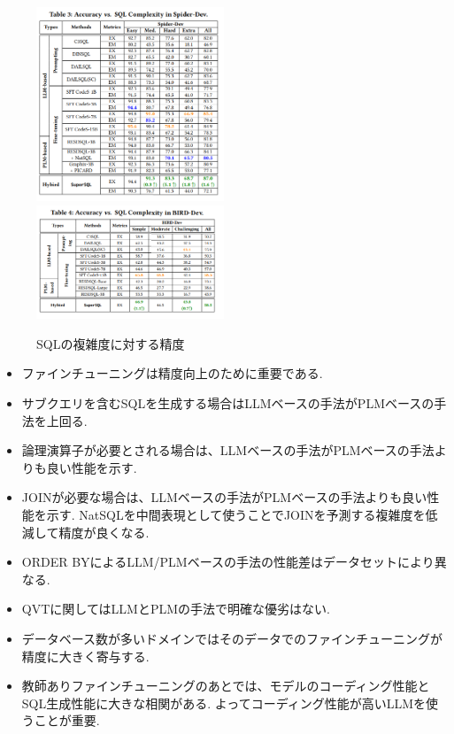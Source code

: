\documentclass[dvipdfmx,uplatex]{jsarticle}
\theoremstyle{remark}
\newenvironment{experiment}[1]{
    \begin{tcolorbox}[
        colframe=violet,
        colback=violet!10!white,
        colbacktitle=violet!40!white,
        coltitle=black,
        fonttitle=\bfseries,
        title={#1}
    ]
}{
    \end{tcolorbox}
}
\begin{document}
\begin{figure}
    \centering
    \includegraphics[width=0.5\textwidth]{img/dawn-nl2sql/acc-vs-complexity.png}
    \includegraphics[width=0.5\textwidth]{img/dawn-nl2sql/acc-vs-complexity-bird.png}
    \caption{SQLの複雑度に対する精度}
    \label{fig:acc-vs-complexity}
\end{figure}

\begin{experiment}{実験結果から得られた発見}
\begin{itemize}
    \item ファインチューニングは精度向上のために重要である.
    \item サブクエリを含むSQLを生成する場合はLLMベースの手法がPLMベースの手法を上回る.
    \item 論理演算子が必要とされる場合は、LLMベースの手法がPLMベースの手法よりも良い性能を示す.
    \item JOINが必要な場合は、LLMベースの手法がPLMベースの手法よりも良い性能を示す. NatSQLを中間表現として使うことでJOINを予測する複雑度を低減して精度が良くなる.
    \item ORDER BYによるLLM/PLMベースの手法の性能差はデータセットにより異なる.
    \item QVTに関してはLLMとPLMの手法で明確な優劣はない.
    \item データベース数が多いドメインではそのデータでのファインチューニングが精度に大きく寄与する.
    \item 教師ありファインチューニングのあとでは、モデルのコーディング性能とSQL生成性能に大きな相関がある. よってコーディング性能が高いLLMを使うことが重要.
\end{itemize}
\end{experiment}
\end{document}
